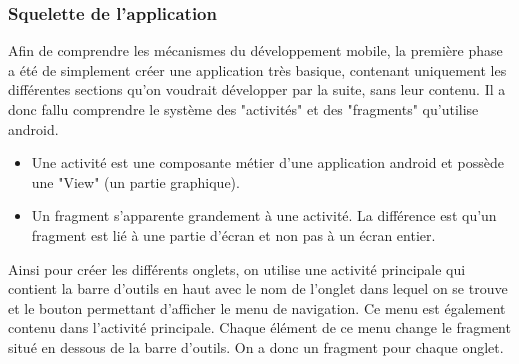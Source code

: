 \subsubsection{Squelette de l'application}
Afin de comprendre les mécanismes du développement mobile, la première phase a été de simplement créer une application très basique, contenant
uniquement les différentes sections qu'on voudrait développer par la suite, sans leur contenu. Il a donc fallu comprendre le système des 
"activités" et des "fragments" qu'utilise android.
\begin{itemize}
  \item Une activité est une composante métier d'une application android et possède une "View" (un partie graphique).
  \item Un fragment s'apparente grandement à une activité. La différence est qu'un fragment est lié à une partie d'écran et non pas à un écran entier. 
\end{itemize}
Ainsi pour créer les différents onglets, on utilise une activité principale qui contient la barre d'outils  en haut avec le nom de l'onglet
dans lequel on se trouve et le bouton permettant d'afficher le menu de navigation. Ce menu est également contenu dans l'activité principale.
Chaque élément de ce menu change le fragment situé en dessous de la barre d'outils. On a donc un fragment pour chaque onglet. 
